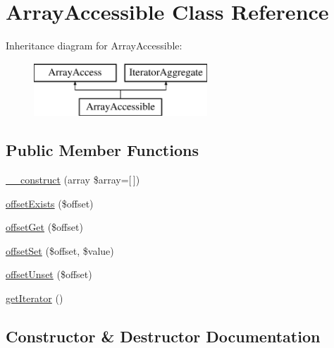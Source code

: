 \hypertarget{class_array_accessible}{}\section{Array\+Accessible Class Reference}
\label{class_array_accessible}
Inheritance diagram for Array\+Accessible\+:\begin{figure}[H]
\begin{center}
\leavevmode
\includegraphics[height=2.000000cm]{class_array_accessible}
\end{center}
\end{figure}
\subsection*{Public Member Functions}
\begin{DoxyCompactItemize}
\item 
\mbox{\hyperlink{class_array_accessible_a051ddc27b65d0b3d514a7b832bb60912}{\+\_\+\+\_\+construct}} (array \$array=\mbox{[}$\,$\mbox{]})
\item 
\mbox{\hyperlink{class_array_accessible_a24ff257ec0c2221bc6fd7b1b4388e26e}{offset\+Exists}} (\$offset)
\item 
\mbox{\hyperlink{class_array_accessible_a59aee6e89465b48f014699f41b521f87}{offset\+Get}} (\$offset)
\item 
\mbox{\hyperlink{class_array_accessible_ac6bde6b1eb50eb5377e91771fe46b7a3}{offset\+Set}} (\$offset, \$value)
\item 
\mbox{\hyperlink{class_array_accessible_a2411227ea7118b13495de9839fd4b563}{offset\+Unset}} (\$offset)
\item 
\mbox{\hyperlink{class_array_accessible_a7a9f937c2958e6f4dd7b030f86fb70b7}{get\+Iterator}} ()
\end{DoxyCompactItemize}


\subsection{Constructor \& Destructor Documentation}
\mbox{\label{class_array_accessible_a051ddc27b65d0b3d514a7b832bb60912}} 
